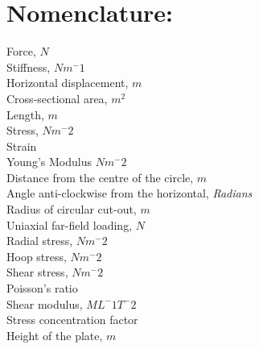 \documentclass[11pt,twocolumn]{article} %
\begin{document}
\section*{Nomenclature:}
	Force, $N$ \\
		Stiffness, $Nm^-1$ \\
		Horizontal displacement, $m$ \\
		Cross-sectional area, $m^2$ \\
		Length, $m$ \\
\makebox[5em][l]{$\sigma$}		Stress, $Nm^-2$ \\
\makebox[5em][l]{$\varepsilon$}		Strain \\
		Young's Modulus $Nm^-2$ \\
		Distance from the centre of the circle, $m$  \\
\makebox[5em][l]{$\theta$}		Angle anti-clockwise from the horizontal, \textit{Radians} \\ 
		Radius of circular cut-out, $m$\\
		Uniaxial far-field loading, $N$ \\
		Radial stress, $Nm^-2$ \\
\makebox[5em][l]{$\sigma_{\theta\theta}$}		Hoop stress, $Nm^-2$ \\
			Shear stress, $Nm^-2$ \\
\makebox[5em][l]{$\nu$}		Poisson's ratio \\
		Shear modulus, $ML^-1T^-2$\\
		Stress concentration factor \\ 
		Height of the plate, $m$\\
\clearpage
\twocolumn
\end{document}
